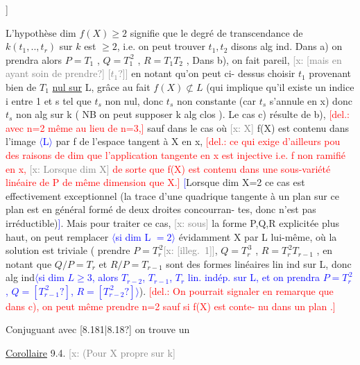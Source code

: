 \documentclass[11pt]{article}
\newcommand{\scanpage}[1]{\par\bigskip\noindent{\small\sffamily[scan #1]}\par}
\newcommand{\mspage}[1]{{\small\sffamily[p.\,#1]}}
\newcommand{\hand}[1]{\textcolor{blue}{#1}}
\newcommand{\inserted}[2][]{\textcolor{blue}{$\langle$#2$\rangle$}}
\newcommand{\deleted}[1]{\textcolor{red}{[\textsf{del.:} #1]}}
\newcommand{\xout}[1]{\textcolor{gray}{[\textsf{x:} #1]}}
\newcommand{\uline}[1]{\underline{#1}}
\newcommand{\unsure}[1]{[#1?]}
\newcommand{\illegible}[1]{[\textsf{illeg.\ #1}]}
\begin{document}
\mspage{56}

\clearpage
\scanpage{25/57}
\mspage{\unsure{92}}

L'hypothèse  dim $f(X)\geqslant 2$  signifie que  le degré de transcendance de
$k(t_1,..,t_r)$ sur $k$  est $\geqslant 2$, i.e. on peut trouver  $t_1,t_2$ disons alg ind.
Dans a) on prendra alors   $P = T_1$ , $Q = T_1^{\,2}$ , $R = T_1T_2$ , Dans b), on
fait pareil, \xout{\unsure{mais en ayant soin de prendre} \unsure{$t_1$}} en notant qu'on peut ci-%
dessus choisir $t_1$ provenant bien de $T_1$ \uline{nul sur} L, grâce au fait $f(X)\not\subset L$
(qui implique qu'il  existe un indice  i  entre 1 et s tel que $t_s$ non
nul, donc $t_s$ non constante (car $t_s$ s'annule en x) donc $t_s$  non alg sur k
( NB on peut supposer k alg clos ).  Le cas c) résulte de b), \deleted{avec n=2
même au lieu de n=3,} sauf dans le cas où \xout{X} f(X) est contenu dans
l'image \inserted{L} par f de l'espace tangent à X en x, \deleted{ce qui  exige d'ailleurs pou
des raisons de dim que l'application tangente en x est injective i.e.
f non ramifié en x, \xout{Lorsque dim X} de sorte que f(X) est contenu dans
une sous-variété linéaire de P de même dimension que X.} \hand{[}Lorsque dim X=2
ce cas est effectivement exceptionnel (la trace d'une quadrique tangente
à un plan sur ce plan est en général formé de deux droites concourran-%
tes, donc n'est pas irréductible)\hand{]}. Mais pour traiter ce cas, \xout{sous} la
forme P,Q,R explicitée plus haut, on peut remplacer \inserted{si dim L $=2$} évidamment X par
L lui-même, où la solution est triviale ( prendre $P=T_r^{\,2}$\xout{\illegible{1}}, $Q=T_r^{\,3}$ ,
$R = T_r^{\,2}T_{r-1}$ , en notant que  $Q/P = T_r$ et  $R/P = T_{r-1}$ sont des formes
linéaires lin ind sur L, donc alg ind\inserted{si dim $L\geqslant 3$, alors $T_{r-2}$, $T_{r-1}$, $T_r$ lin. indép. sur L, et on prendra $P=T_r^{\,2}$, $Q=\unsure{T_{r-1}^{\,2}}$, $R=\unsure{T_{r-2}^{\,2}}$}). \deleted{On pourrait signaler en
remarque que dans c), on peut même prendre n=2  sauf si  f(X) est conte-%
nu dans un plan .}

Conjuguant avec \unsure{8.181|8.18} on trouve un

\uline{Corollaire} 9.4.   \xout{(Pour X propre sur k}
\end{document}
